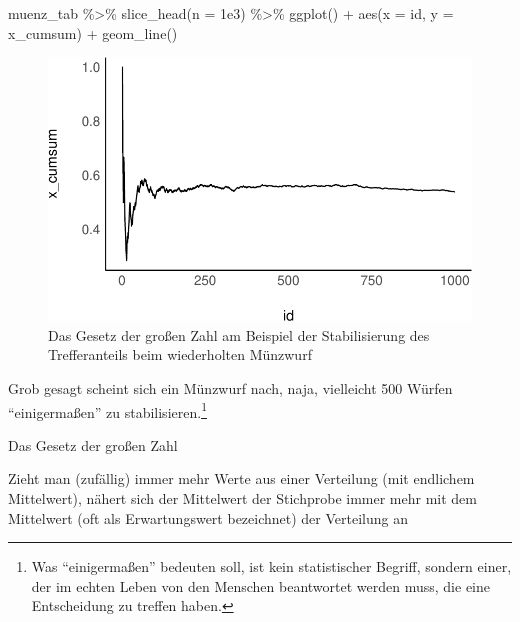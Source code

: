\documentclass[
  a4paper,
  DIV=11]{scrreprt}
\newenvironment{Shaded}{\begin{snugshade}}{\end{snugshade}}
\newcommand{\AttributeTok}[1]{\textcolor[rgb]{0.40,0.45,0.13}{#1}}
\newcommand{\FloatTok}[1]{\textcolor[rgb]{0.68,0.00,0.00}{#1}}
\newcommand{\FunctionTok}[1]{\textcolor[rgb]{0.28,0.35,0.67}{#1}}
\newcommand{\NormalTok}[1]{\textcolor[rgb]{0.00,0.23,0.31}{#1}}
\newcommand{\SpecialCharTok}[1]{\textcolor[rgb]{0.37,0.37,0.37}{#1}}
\theoremstyle{definition}
\theoremstyle{remark}
\begin{document}
\begin{Shaded}
\begin{Highlighting}[]
\NormalTok{muenz\_tab }\SpecialCharTok{\%\textgreater{}\%} 
  \FunctionTok{slice\_head}\NormalTok{(}\AttributeTok{n =} \FloatTok{1e3}\NormalTok{) }\SpecialCharTok{\%\textgreater{}\%} 
  \FunctionTok{ggplot}\NormalTok{() }\SpecialCharTok{+}
  \FunctionTok{aes}\NormalTok{(}\AttributeTok{x =}\NormalTok{ id, }\AttributeTok{y =}\NormalTok{ x\_cumsum) }\SpecialCharTok{+}
  \FunctionTok{geom\_line}\NormalTok{()}
\end{Highlighting}
\end{Shaded}

\begin{figure}[H]

{\centering \includegraphics{./Verteilungen_files/figure-pdf/fig-lln-1.pdf}

}

\caption{\label{fig-lln}Das Gesetz der großen Zahl am Beispiel der
Stabilisierung des Trefferanteils beim wiederholten Münzwurf}

\end{figure}

Grob gesagt scheint sich ein Münzwurf nach, naja, vielleicht 500 Würfen
``einigermaßen'' zu stabilisieren.\footnote{Was ``einigermaßen''
  bedeuten soll, ist kein statistischer Begriff, sondern einer, der im
  echten Leben von den Menschen beantwortet werden muss, die eine
  Entscheidung zu treffen haben.}

\begin{tcolorbox}[enhanced jigsaw, left=2mm, colframe=quarto-callout-important-color-frame, opacityback=0, arc=.35mm, rightrule=.15mm, breakable, toptitle=1mm, colbacktitle=quarto-callout-important-color!10!white, colback=white, coltitle=black, bottomrule=.15mm, titlerule=0mm, opacitybacktitle=0.6, bottomtitle=1mm, title=\textcolor{quarto-callout-important-color}{\faExclamation}\hspace{0.5em}{Wichtig}, toprule=.15mm, leftrule=.75mm]
Das Gesetz der großen Zahl

Zieht man (zufällig) immer mehr Werte aus einer Verteilung (mit
endlichem Mittelwert), nähert sich der Mittelwert der Stichprobe immer
mehr mit dem Mittelwert (oft als Erwartungswert bezeichnet) der
Verteilung an
\end{tcolorbox}
\end{document}
